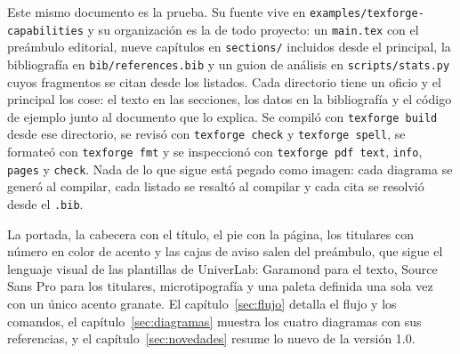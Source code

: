 Este mismo documento es la prueba. Su fuente vive en
\texttt{examples/texforge-capabilities} y su organización es la de todo
proyecto: un \texttt{main.tex} con el preámbulo editorial, nueve capítulos
en \texttt{sections/} incluidos desde el principal, la bibliografía en
\texttt{bib/references.bib} y un guion de análisis en
\texttt{scripts/stats.py} cuyos fragmentos se citan desde los listados.
Cada directorio tiene un oficio y el principal los cose: el texto en las
secciones, los datos en la bibliografía y el código de ejemplo junto al
documento que lo explica. Se compiló con \texttt{texforge build} desde
ese directorio, se revisó con \texttt{texforge check} y
\texttt{texforge spell}, se formateó con \texttt{texforge fmt} y se
inspeccionó con \texttt{texforge pdf text}, \texttt{info}, \texttt{pages} y
\texttt{check}. Nada de lo que sigue está pegado como imagen: cada
diagrama se generó al compilar, cada listado se resaltó al compilar y
cada cita se resolvió desde el \texttt{.bib}.

La portada, la cabecera con el título, el pie con la página, los
titulares con número en color de acento y las cajas de aviso salen del
preámbulo, que sigue el lenguaje visual de las plantillas de UniverLab:
Garamond para el texto, Source Sans Pro para los titulares, microtipografía
y una paleta definida una sola vez con un único acento granate. El
capítulo~\ref{sec:flujo} detalla el flujo y los comandos, el
capítulo~\ref{sec:diagramas} muestra los cuatro diagramas con sus
referencias, y el capítulo~\ref{sec:novedades} resume lo nuevo de la
versión 1.0.
